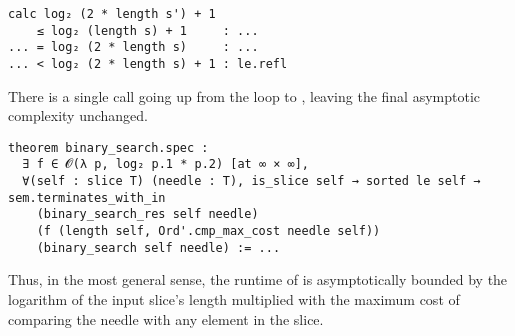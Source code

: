 \begin{verbatim}
calc log₂ (2 * length s') + 1
    ≤ log₂ (length s) + 1     : ...
... = log₂ (2 * length s)     : ...
... < log₂ (2 * length s) + 1 : le.refl
\end{verbatim}

There is a single call going up from the loop to , leaving
the final asymptotic complexity unchanged.

\begin{verbatim}
theorem binary_search.spec :
  ∃ f ∈ 𝓞(λ p, log₂ p.1 * p.2) [at ∞ × ∞],
  ∀(self : slice T) (needle : T), is_slice self → sorted le self → sem.terminates_with_in
    (binary_search_res self needle)
    (f (length self, Ord'.cmp_max_cost needle self))
    (binary_search self needle) := ...
\end{verbatim}

Thus, in the most general sense, the runtime of  is
asymptotically bounded by the logarithm of the input slice's length multiplied
with the maximum cost of comparing the needle with any element in the slice.